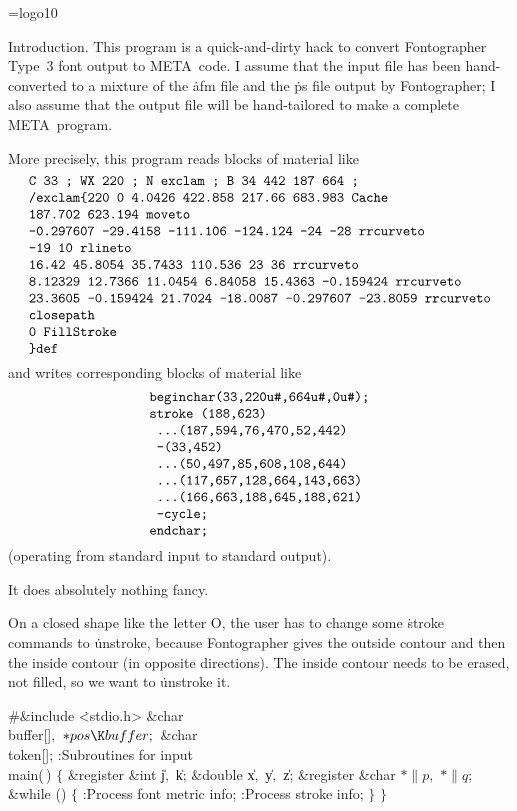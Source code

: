 
\srcloctrue
\datethis
\font\logo=logo10
\def\MF{{\logo META}\-{\logo FONT}}


Introduction. This program is a quick-and-dirty hack to
convert
Fontographer Type~3 font output to \MF\ code. I assume that the input
file has been hand-converted to a mixture of the \.{afm} file and
the \.{ps} file output by Fontographer; I also assume that the output
file will be hand-tailored to make a complete \MF\ program.

More precisely, this program reads blocks of material like
$$\vbox{\halign{\tt#\cr
C 33 ; WX 220 ; N exclam ; B 34 442 187 664 ;\cr
/exclam\char`\{220 0 4.0426 422.858 217.66 683.983 Cache\cr
187.702 623.194 moveto\cr
-0.297607 -29.4158 -111.106 -124.124 -24 -28 rrcurveto\cr
-19 10 rlineto\cr
16.42 45.8054 35.7433 110.536 23 36 rrcurveto\cr
8.12329 12.7366 11.0454 6.84058 15.4363 -0.159424 rrcurveto\cr
23.3605 -0.159424 21.7024 -18.0087 -0.297607 -23.8059 rrcurveto\cr
closepath\cr
0 FillStroke\cr
\char`\}def\cr
}}$$
and writes corresponding blocks of material like
$$\vbox{\halign{\tt#\cr
beginchar(33,220u\char`#,664u\char`#,0u\char`#);\cr
stroke (188,623)\cr
\ ...(187,594,76,470,52,442)\cr
\ --(33,452)\cr
\ ...(50,497,85,608,108,644)\cr
\ ...(117,657,128,664,143,663)\cr
\ ...(166,663,188,645,188,621)\cr
\ --cycle;\cr
endchar;\cr
}}$$
(operating from standard input to standard output).

It does absolutely nothing fancy.

On a closed shape like the letter O, the user has to change some \.{stroke}
commands to \.{unstroke}, because Fontographer gives the outside contour and
then the inside contour (in opposite directions). The inside contour needs
to be erased, not filled, so we want to \.{unstroke} it.

\Y\B\8\#\&{include} \.{<stdio.h>}\6
\&{char} \\{buffer}[]${},{}$ ${}{*}\\{pos}\K\\{buffer};{}$\6
\&{char} \\{token}[];\7
:Subroutines for input\X\7
\\{main}(\,)\1\1\2\2\6
${}\{{}$\1\6
\&{register} \&{int} \|j${},{}$ \|k;\6
\&{double} \|x${},{}$ \|y${},{}$ \|z;\6
\&{register} \&{char} ${}{*}\|p,{}$ ${}{*}\|q;{}$\7
\&{while} ()\5
${}\{{}$\1\6
:Process font metric info\X;\6
:Process stroke info\X;\6
\4${}\}{}$\2\6
\4${}\}{}$\2\par
\fi

